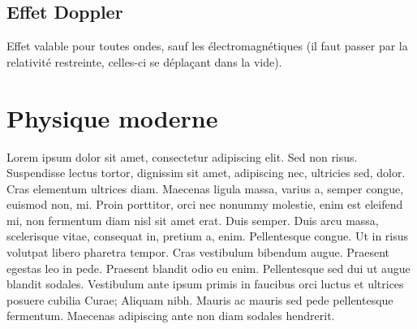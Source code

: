 \documentclass	[11pt, a4paper, openany]{book}
\begin{document}
\section{Effet Doppler}
Effet valable pour toutes ondes, sauf les électromagnétiques (il faut passer par la relativité restreinte, celles-ci se déplaçant dans la vide).




































\chapter{Physique moderne}

Lorem ipsum dolor sit amet, consectetur adipiscing elit. Sed non risus. Suspendisse lectus tortor, dignissim sit amet, adipiscing nec, ultricies sed, dolor. Cras elementum ultrices diam. Maecenas ligula massa, varius a, semper congue, euismod non, mi. Proin porttitor, orci nec nonummy molestie, enim est eleifend mi, non fermentum diam nisl sit amet erat. Duis semper. Duis arcu massa, scelerisque vitae, consequat in, pretium a, enim. Pellentesque congue. Ut in risus volutpat libero pharetra tempor. Cras vestibulum bibendum augue. Praesent egestas leo in pede. Praesent blandit odio eu enim. Pellentesque sed dui ut augue blandit sodales. Vestibulum ante ipsum primis in faucibus orci luctus et ultrices posuere cubilia Curae; Aliquam nibh. Mauris ac mauris sed pede pellentesque fermentum. Maecenas adipiscing ante non diam sodales hendrerit.
\end{document}
